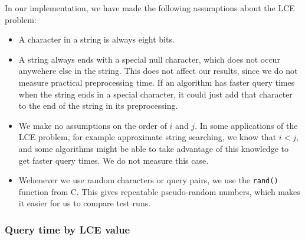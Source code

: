 \documentclass[a4]{article}
\begin{document}
In our implementation, we have made the following assumptions about the LCE problem:
\begin{itemize}
\item A character in a string is always eight bits.
\item A string always ends with a special null character, which does not occur anywehere else in the string. This does not affect our results, since we do not measure practical preprocessing time. If an algorithm has faster query times when the string ends in a special character, it could just add that character to the end of the string in its preprocessing.
\item We make no assumptions on the order of $i$ and $j$. In some applications of the LCE problem, for example approximate string searching, we know that $i<j$, and some algorithms might be able to take advantage of this knowledge to get faster query times. We do not measure this case.
\item Wehenever we use random characters or query pairs, we use the \texttt{rand()} function from C. This gives repeatable pseudo-random numbers, which makes it easier for us to compare test runs.
\end{itemize}


\subsubsection{Query time by LCE value}
\end{document}
